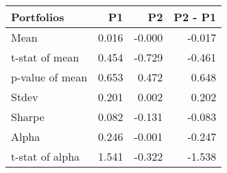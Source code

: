 \begin{tabular}{lrrr}
\toprule
Portfolios & P1 & P2 & P2 - P1 \\
\midrule
Mean & 0.016 & -0.000 & -0.017 \\
t-stat of mean & 0.454 & -0.729 & -0.461 \\
p-value of mean & 0.653 & 0.472 & 0.648 \\
Stdev & 0.201 & 0.002 & 0.202 \\
Sharpe & 0.082 & -0.131 & -0.083 \\
Alpha & 0.246 & -0.001 & -0.247 \\
t-stat of alpha & 1.541 & -0.322 & -1.538 \\
\bottomrule
\end{tabular}
